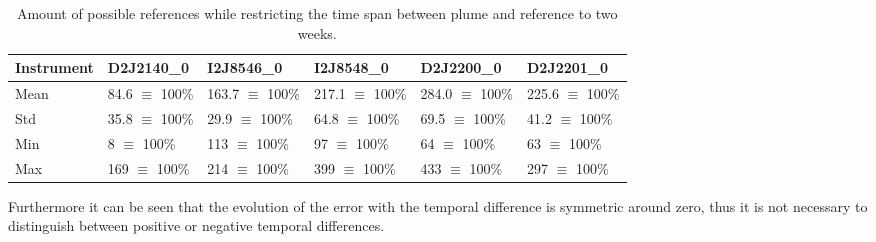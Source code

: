 \documentclass  [
  paper    = a4,
  BCOR     = 10mm,
  twoside,
  fontsize = 12pt,
  fleqn,
  toc      = bibnumbered,
  toc      = listofnumbered,
  numbers  = noendperiod,
  headings = normal,
  listof   = leveldown,
  version  = 3.03
]                                       {scrreprt}
\begin{document}
	\begin{table}[h]
		\begin{tabular}{|p{2cm}|p{2cm}|p{2cm}|p{2cm}|p{2cm}|p{2cm}|}
			Instrument	&D2J2140\_0&I2J8546\_0& I2J8548\_0&D2J2200\_0&D2J2201\_0\\
			\toprule
			Mean&84.6 $\equiv$ 100\%&163.7 $\equiv$ 100\%&217.1 $\equiv$ 100\%&284.0 $\equiv$ 100\%&225.6 $\equiv$ 100\%\\
			\midrule
			Std&
			35.8 $\equiv$ 100\%&
			29.9 $\equiv$ 100\%&
			64.8 $\equiv$ 100\%&
			69.5 $\equiv$ 100\%&
			41.2 $\equiv$ 100\%\\
			\midrule
			Min&
			8 $\equiv$ 100\%&
			113 $\equiv$ 100\%&
			97 $\equiv$ 100\%&
			64 $\equiv$ 100\% &
			63 $\equiv$ 100\%\\
			\midrule
			Max&
			169 $\equiv$ 100\%&
			214 $\equiv$ 100\%
			&399 $\equiv$ 100\%
			&433  $\equiv$ 100\%
			&297 $\equiv$ 100\% \\
			\bottomrule
		\end{tabular}
	\caption{Amount of possible references while restricting the time span between plume and reference to two weeks.}
	\label{Tab:refstime}
	\end{table}	

	Furthermore it can be seen that the evolution of the   error with the temporal difference is symmetric around zero, thus it is not necessary to distinguish between positive or negative temporal differences.\\

	
\end{document}

